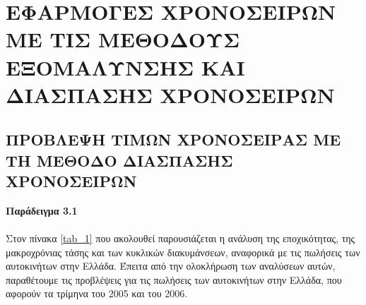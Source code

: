 
\chapter{ΕΦΑΡΜΟΓΕΣ ΧΡΟΝΟΣΕΙΡΩΝ ΜΕ ΤΙΣ ΜΕΘΟΔΟΥΣ ΕΞΟΜΑΛΥΝΣΗΣ ΚΑΙ ΔΙΑΣΠΑΣΗΣ ΧΡΟΝΟΣΕΙΡΩΝ }
\section{ΠΡΟΒΛΕΨΗ ΤΙΜΩΝ ΧΡΟΝΟΣΕΙΡΑΣ ΜΕ ΤΗ ΜΕΘΟΔΟ ΔΙΑΣΠΑΣΗΣ ΧΡΟΝΟΣΕΙΡΩΝ}
\textbf{Παράδειγμα 3.1}\\\\
Στον πίνακα \ref{tab_1} που ακολουθεί παρουσιάζεται
η ανάλυση της εποχικότητας, της μακροχρόνιας τάσης και των κυκλικών διακυμάνσεων, αναφορικά με τις πωλήσεις των αυτοκινήτων στην Ελλάδα. Έπειτα από την ολοκλήρωση των αναλύσεων αυτών, παραθέτουμε τις προβλέψεις για τις πωλήσεις των αυτοκινήτων στην Ελλάδα, που αφορούν τα τρίμηνα του 2005
και του 2006.

